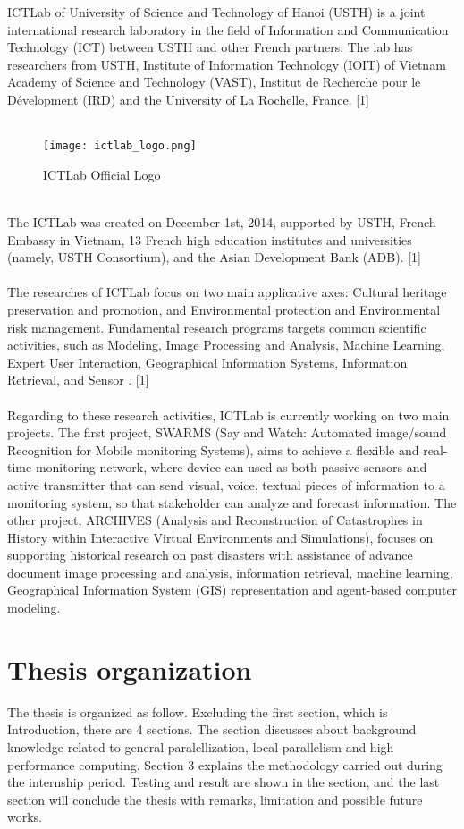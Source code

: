 ICTLab of University of Science and Technology of Hanoi (USTH) is a joint international research laboratory in the field of Information and Communication Technology (ICT) between USTH and other French partners. The lab has researchers from USTH, Institute of Information Technology (IOIT) of Vietnam Academy of Science and Technology (VAST), Institut de Recherche pour le Dévelopment (IRD) and the University of La Rochelle, France. [1] \\
~\\
\begin{figure}[h]
\texttt{[image: ictlab\_logo.png]}
\centering
\caption{ICTLab Official Logo}
\end{figure}
~\\
The ICTLab was created on December 1st, 2014, supported by USTH, French Embassy in Vietnam, 13 French high education institutes and universities (namely, USTH Consortium), and the Asian Development Bank (ADB). [1] \\
~\\
The researches of ICTLab focus on two main applicative axes: Cultural heritage preservation and promotion, and Environmental protection and Environmental risk management. Fundamental research programs targets common scientific activities, such as Modeling, Image Processing and Analysis, Machine Learning, Expert User Interaction, Geographical Information Systems, Information Retrieval, and Sensor . [1] \\
~\\
Regarding to these research activities, ICTLab is currently working on two main projects. The first project, SWARMS (Say and Watch: Automated image/sound Recognition for Mobile monitoring Systems), aims to achieve a flexible and real-time monitoring network, where device can used as both passive sensors and active transmitter that can send visual, voice, textual pieces of information to a monitoring system, so that stakeholder can analyze and forecast information. The other project, ARCHIVES (Analysis and Reconstruction of Catastrophes in History within Interactive Virtual Environments and Simulations), focuses on supporting historical research on past disasters with assistance of advance document image processing and analysis, information retrieval, machine learning, Geographical Information System (GIS) representation and agent-based computer modeling. \\

\section{Thesis organization}

The thesis is organized as follow. Excluding the first section, which is Introduction, there are 4 sections. The  section discusses about background knowledge related to general paralellization, local parallelism and high performance computing. Section 3 explains the methodology carried out during the internship period. Testing and result are shown in the  section, and the last section will conclude the thesis with remarks, limitation and possible future works. 
